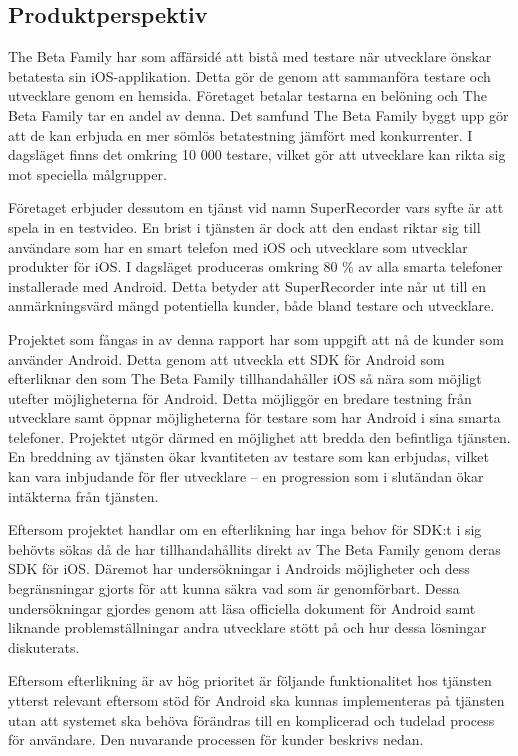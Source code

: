 \subsection{Produktperspektiv}
\label{subsec:perspective}

The Beta Family har som affärsidé att bistå med testare när utvecklare önskar betatesta sin iOS-applikation. Detta gör de genom att sammanföra testare och utvecklare genom en hemsida. Företaget betalar testarna en belöning och The Beta Family tar en andel av denna. Det samfund The Beta Family byggt upp gör att de kan erbjuda en mer sömlös betatestning jämfört med konkurrenter. I dagsläget finns det omkring 10 000 testare, vilket gör att utvecklare kan rikta sig mot speciella målgrupper.

 Företaget erbjuder dessutom en tjänst vid namn SuperRecorder vars syfte är att spela in en testvideo. En brist i tjänsten är dock att den endast riktar sig till användare som har en smart telefon med iOS och utvecklare som utvecklar produkter för iOS. I dagsläget produceras omkring 80 \% av alla smarta telefoner installerade med Android\parencite{ http://www.idc.com/getdoc.jsp?containerId=prUS24442013}. Detta betyder att SuperRecorder inte når ut till en anmärkningsvärd mängd potentiella kunder, både bland testare och utvecklare.

Projektet som fångas in av denna rapport har som uppgift att nå de kunder som använder Android. Detta genom att utveckla ett SDK för Android som efterliknar den som The Beta Family tillhandahåller iOS så nära som möjligt utefter möjligheterna för Android. Detta möjliggör en bredare testning från utvecklare samt öppnar möjligheterna för testare som har Android i sina smarta telefoner. Projektet utgör därmed en möjlighet att bredda den befintliga tjänsten. En breddning av tjänsten ökar kvantiteten av testare som kan erbjudas, vilket kan vara inbjudande för fler utvecklare – en progression som i slutändan ökar intäkterna från tjänsten.

Eftersom projektet handlar om en efterlikning har inga behov för SDK:t i sig behövts sökas då de har tillhandahållits direkt av The Beta Family genom deras SDK för iOS. Däremot har undersökningar i Androids möjligheter och dess begränsningar gjorts för att kunna säkra vad som är genomförbart. Dessa undersökningar gjordes genom att läsa officiella dokument för Android samt liknande problemställningar andra utvecklare stött på och hur dessa lösningar diskuterats.

Eftersom efterlikning är av hög prioritet är följande funktionalitet hos tjänsten ytterst relevant eftersom stöd för Android ska kunnas implementeras på tjänsten utan att systemet ska behöva förändras till en komplicerad och tudelad process för användare. Den nuvarande processen för kunder beskrivs nedan.

